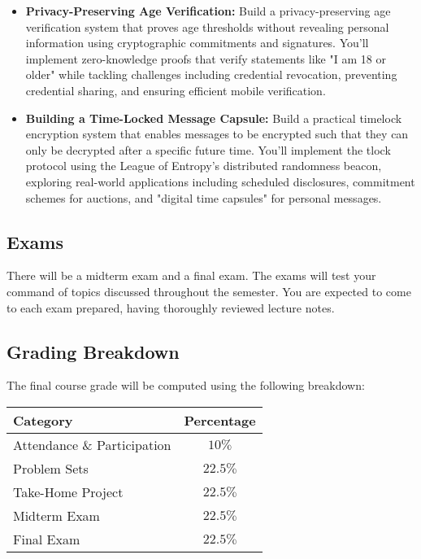 \documentclass[10pt,a4paper,american]{exam}
\begin{document}
\begin{itemize}
	\item \textbf{Privacy-Preserving Age Verification:} Build a privacy-preserving age verification system that proves age thresholds without revealing personal information using cryptographic commitments and signatures. You'll implement zero-knowledge proofs that verify statements like "I am 18 or older" while tackling challenges including credential revocation, preventing credential sharing, and ensuring efficient mobile verification.
	\item \textbf{Building a Time-Locked Message Capsule:} Build a practical timelock encryption system that enables messages to be encrypted such that they can only be decrypted after a specific future time. You'll implement the tlock protocol using the League of Entropy's distributed randomness beacon, exploring real-world applications including scheduled disclosures, commitment schemes for auctions, and "digital time capsules" for personal messages.
\end{itemize}

\subsection{Exams}
There will be a midterm exam and a final exam. The exams will test your command of topics discussed throughout the semester. You are expected to come to each exam prepared, having thoroughly reviewed lecture notes.

\subsection{Grading Breakdown}
The final course grade will be computed using the following breakdown:

\begin{center}
	\renewcommand{\arraystretch}{2}
	\begin{tabular}{|p{2.5in}|c|}
		\hline
		\textbf{Category}           & \textbf{Percentage} \\
		\hline
		Attendance \& Participation & $10\%$              \\
		\hline
		Problem Sets                & $22.5\%$            \\
		\hline
		Take-Home Project           & $22.5\%$            \\
		\hline
		Midterm Exam                & $22.5\%$            \\
		\hline
		Final Exam                  & $22.5\%$            \\
		\hline
	\end{tabular}
\end{center}
\end{document}
